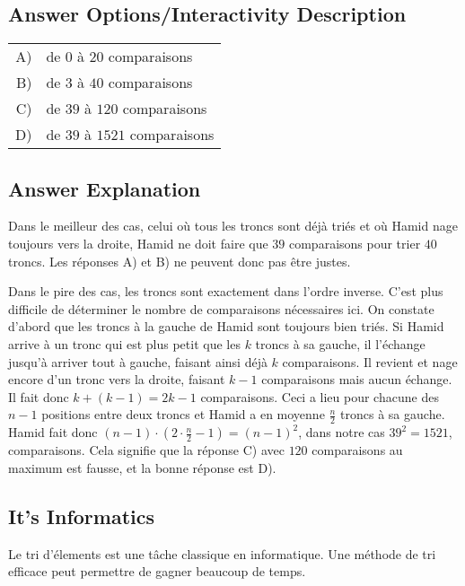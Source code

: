 \documentclass[a4paper,11pt]{report}
\begin{document}
\begingroup
\renewcommand{\arraystretch}{1.5}
\subsection*{Answer Options/Interactivity Description}

\begin{tabular}{ @{} r l @{} }
  A) & de $0$ à $20$ comparaisons \\ 
  B) & de $3$ à $40$ comparaisons \\ 
  C) & de $39$ à $120$ comparaisons \\ 
  D) & de $39$ à $1521$ comparaisons
\end{tabular}

\endgroup

\subsection*{Answer Explanation}

Dans le meilleur des cas, celui où tous les troncs sont déjà triés et où Hamid nage toujours vers la droite, Hamid ne doit faire que $39$ comparaisons pour trier $40$ troncs. Les réponses A) et B) ne peuvent donc pas être justes.

Dans le pire des cas, les troncs sont exactement dans l’ordre inverse. C’est plus difficile de déterminer le nombre de comparaisons nécessaires ici. On constate d’abord que les troncs à la gauche de Hamid sont toujours bien triés. Si Hamid arrive à un tronc qui est plus petit que les ${k}$ troncs à sa gauche, il l’échange jusqu’à arriver tout à gauche, faisant ainsi déjà ${k}$ comparaisons. Il revient et nage encore d’un tronc vers la droite, faisant ${k-1}$ comparaisons mais aucun échange. Il fait donc ${k + (k-1) = 2k - 1}$ comparaisons. Ceci a lieu pour chacune des ${n-1}$ positions entre deux troncs et Hamid a en moyenne ${\frac{n}{2}}$ troncs à sa gauche. Hamid fait donc ${(n-1)\cdot(2\cdot\frac{n}{2}-1)=(n-1)^2}$, dans notre cas ${39^2= 1521}$, comparaisons. Cela signifie que la réponse C) avec $120$ comparaisons au maximum est fausse, et la bonne réponse est D).


\subsection*{It’s Informatics}

Le tri d’élements est une tâche classique en informatique. Une méthode de tri efficace peut permettre de gagner beaucoup de temps.
\end{document}
